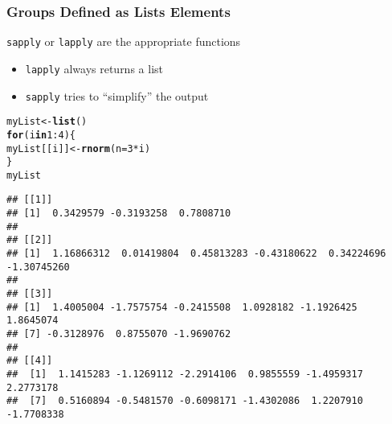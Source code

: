 \documentclass[paper=screen,mathserif]{beamer}\usepackage[]{graphicx}\usepackage[]{color}
\makeatletter
\newcommand{\hlnum}[1]{\textcolor[rgb]{0.686,0.059,0.569}{#1}}%
\newcommand{\hlopt}[1]{\textcolor[rgb]{0,0,0}{#1}}%
\newcommand{\hlstd}[1]{\textcolor[rgb]{0.345,0.345,0.345}{#1}}%
\newcommand{\hlkwa}[1]{\textcolor[rgb]{0.161,0.373,0.58}{\textbf{#1}}}%
\newcommand{\hlkwb}[1]{\textcolor[rgb]{0.69,0.353,0.396}{#1}}%
\newcommand{\hlkwc}[1]{\textcolor[rgb]{0.333,0.667,0.333}{#1}}%
\newcommand{\hlkwd}[1]{\textcolor[rgb]{0.737,0.353,0.396}{\textbf{#1}}}%
\newenvironment{kframe}{%
 \def\at@end@of@kframe{}%
 \ifinner\ifhmode%
  \def\at@end@of@kframe{\end{minipage}}%
  \begin{minipage}{\columnwidth}%
 \fi\fi%
 \def\FrameCommand##1{\hskip\@totalleftmargin \hskip-\fboxsep
 \colorbox{shadecolor}{##1}\hskip-\fboxsep
     \hskip-\linewidth \hskip-\@totalleftmargin \hskip\columnwidth}%
 \MakeFramed {\advance\hsize-\width
   \@totalleftmargin\z@ \linewidth\hsize
   \@setminipage}}%
 {\par\unskip\endMakeFramed%
 \at@end@of@kframe}
\newenvironment{knitrout}{}{} %
\newcommand{\ft}[1]{\frametitle{#1}}
\makeatother
\begin{document}
\begin{frame}[fragile]
  \ft{Groups Defined as Lists Elements}
  
  \verb=sapply= or \verb=lapply= are the appropriate functions
  \begin{itemize}
  \item \verb=lapply= always returns a list
  \item \verb=sapply= tries to ``simplify'' the output
  \end{itemize}
\pause
\begin{knitrout}\tiny
{}\color{fgcolor}\begin{kframe}
\begin{alltt}
\hlstd{myList} \hlkwb{<-} \hlkwd{list}\hlstd{()}
\hlkwa{for} \hlstd{(i} \hlkwa{in} \hlnum{1}\hlopt{:}\hlnum{4}\hlstd{) \{}
    \hlstd{myList[[i]]} \hlkwb{<-} \hlkwd{rnorm}\hlstd{(}\hlkwc{n} \hlstd{=} \hlnum{3} \hlopt{*} \hlstd{i)}
\hlstd{\}}
\hlstd{myList}
\end{alltt}
\begin{verbatim}
## [[1]]
## [1]  0.3429579 -0.3193258  0.7808710
## 
## [[2]]
## [1]  1.16866312  0.01419804  0.45813283 -0.43180622  0.34224696 -1.30745260
## 
## [[3]]
## [1]  1.4005004 -1.7575754 -0.2415508  1.0928182 -1.1926425  1.8645074
## [7] -0.3128976  0.8755070 -1.9690762
## 
## [[4]]
##  [1]  1.1415283 -1.1269112 -2.2914106  0.9855559 -1.4959317  2.2773178
##  [7]  0.5160894 -0.5481570 -0.6098171 -1.4302086  1.2207910 -1.7708338
\end{verbatim}
\end{kframe}
\end{knitrout}

\end{frame}
\end{document}
